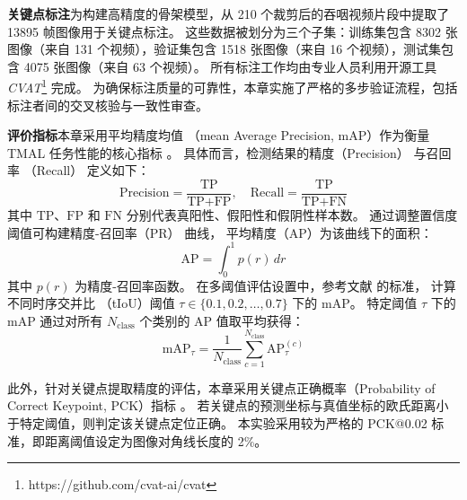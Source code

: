 \textbf{关键点标注}\quad 为构建高精度的骨架模型，从 210 个裁剪后的吞咽视频片段中提取了 13895 帧图像用于关键点标注。
这些数据被划分为三个子集：训练集包含 8302 张图像（来自 131 个视频），验证集包含 1518 张图像（来自 16 个视频），测试集包含 4075 张图像（来自 63 个视频）。
所有标注工作均由专业人员利用开源工具 \textit{CVAT}\footnote{https://github.com/cvat-ai/cvat} 完成。
为确保标注质量的可靠性，本章实施了严格的多步验证流程，包括标注者间的交叉核验与一致性审查。

\textbf{评价指标}\quad 本章采用平均精度均值 （mean Average Precision, mAP）作为衡量 TMAL 任务性能的核心指标 \cite{ruan2023temporal, zhang2023locating}。
具体而言，检测结果的精度（Precision） 与召回率 （Recall） 定义如下：
\begin{equation}
\text{Precision} = \frac{\text{TP}}{\text{TP} + \text{FP}}, \quad \text{Recall} = \frac{\text{TP}}{\text{TP} + \text{FN}}
\end{equation}
其中 \(\text{TP}\)、\(\text{FP}\) 和 \(\text{FN}\) 分别代表真阳性、假阳性和假阴性样本数。
通过调整置信度阈值可构建精度-召回率（PR） 曲线，
平均精度（AP）为该曲线下的面积：
\begin{equation}
\text{AP} = \int_{0}^{1} p(r) \, dr
\end{equation}
其中 \( p(r) \) 为精度-召回率函数。
在多阈值评估设置中，参考文献 \parencite{ruan2023temporal} 的标准，
计算不同时序交并比 （tIoU）阈值 \(\tau \in \{0.1, 0.2, \dots, 0.7\}\) 下的 mAP。
特定阈值 \(\tau\) 下的 mAP 通过对所有 \(N_{\text{class}}\) 个类别的 AP 值取平均获得：
\begin{equation}
\text{mAP}_\tau = \frac{1}{N_{\text{class}}} \sum_{c=1}^{N_{\text{class}}} \text{AP}_\tau^{(c)}
\end{equation}

此外，针对关键点提取精度的评估，本章采用关键点正确概率（Probability of Correct Keypoint, PCK）指标 \cite{yang2012articulated, moskvyak2021semi}。
若关键点的预测坐标与真值坐标的欧氏距离小于特定阈值，则判定该关键点定位正确。
本实验采用较为严格的 PCK@0.02 标准，即距离阈值设定为图像对角线长度的 2\%。

